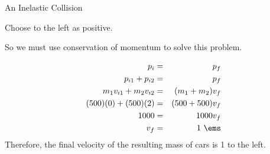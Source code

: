 \begin{wex}{An Inelastic Collision}
{
Choose to the left as positive.

So we must use conservation of momentum to solve this problem. 

\begin{eqnarray*}
p_{i} & = & p_{f} \\
p_{i1} + p_{i2} &=& p_{f} \\
m_{1}v_{i1} + m_{2}v_{i2} &=& (m_{1} +m_{2})v_f \\
(500)(0) + (500)(2) &=& (500+500)v_f \\
1 000 &=& 1000 v_f \\
v_f &=& 1\ \ems
\end{eqnarray*}
Therefore, the final velocity of the resulting mass of cars is 1 \ms to the left.
}
\end{wex}

